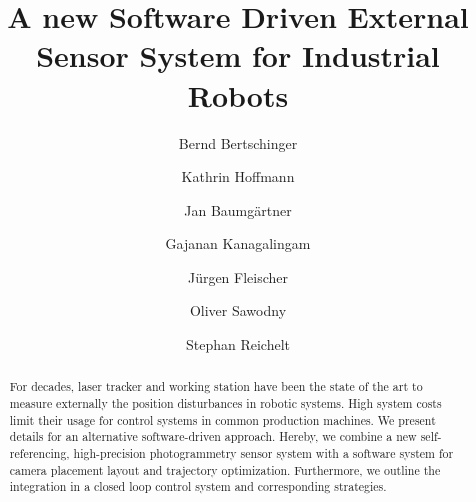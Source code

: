 \documentclass[5p,times,procedia]{elsarticle}
\begin{document}
\begin{frontmatter}



%

\title{A new Software Driven External Sensor System for Industrial Robots}


\author[a]{Bernd Bertschinger\corref{*}}
\author[b]{Kathrin Hoffmann}
\author[c]{Jan Baumgärtner}
\author[b]{Gajanan Kanagalingam}
\author[c]{Jürgen Fleischer}
\author[b]{Oliver Sawodny}
\author[a]{Stephan Reichelt}

\address[a]{Institute of Applied Optics, University of Stuttgart - ITO, Pfaffenwaldring 9, 70569 Stuttgart, Germany}
\address[b]{Institute for System Dynamics, University of Stuttgart - ISYS, Waldburgstr. 17/19, 70563 Stuttgart, Germany}
\address[c]{Institute of Production Science, Karlsruhe Institute of Technology - WBK, Kaiserstraße 12, 76131 Karlsruhe, Germany}


\begin{abstract}
For decades, laser tracker and working station have been the state of the art to measure externally the position disturbances in robotic systems. High system costs limit their usage for control systems in common production machines. We present details for an alternative software-driven approach. Hereby, we combine a new self-referencing, high-precision photogrammetry sensor system with a software system for camera placement layout and trajectory optimization. Furthermore, we outline the integration in a closed loop control system and corresponding strategies.
\end{abstract}


\end{frontmatter}
\end{document}
